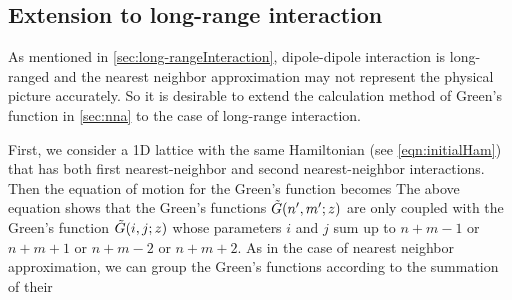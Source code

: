 \subsection{Extension to long-range interaction}
\label{sec:long-range}

As mentioned in \autoref{sec:long-rangeInteraction}, dipole-dipole interaction is long-ranged and the nearest 
neighbor approximation may not represent the physical picture accurately. So it is desirable to extend the 
calculation method of Green's function in \autoref{sec:nna} to the case of long-range interaction. 

First, we consider a 1D lattice with the same Hamiltonian (see \autoref{eqn:initialHam}) that has
both first nearest-neighbor and second nearest-neighbor interactions. 
Then the equation of motion for the Green's
function becomes
The above equation shows that the
Green's functions $\Tilde{G}(n^{\prime}, m^{\prime}; z)$ are only coupled with the Green's function 
$\Tilde{G}(i, j; z)$ whose parameters $i$ and $ j$ sum up to $n+m-1$ or $n+m+1$ or $n+m-2$ or $n+m+2$. As in the
case of nearest neighbor approximation, we can group the Green's functions according to the summation of their 
